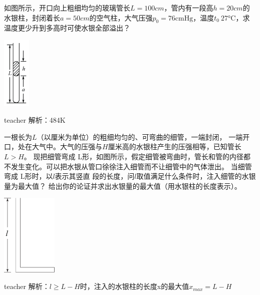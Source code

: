 \begin{example}
	如图所示，开口向上粗细均匀的玻璃管长$L = 100\si{cm}$，管内有一段高$h=20\si{cm}$的水银柱，封闭着长$a=50\si{cm}$的空气柱，大气压强$p_0 = 76\text{cmHg}$，温度$t_0 \ 27\si{\degreeCelsius}$，求温度更少升到多高时可使水银全部溢出？
		\begin{flushright}
			\includegraphics[width = 0.1\textwidth]{images/thermal-9.pdf} 
		\end{flushright}
	\begin{taggedblock}{teacher}
		\noindent
		解析：484K
	\end{taggedblock}
\end{example}

\begin{example}
	一根长为$ L（$以厘米为单位）的粗细均匀的、可弯曲的细管，一端封闭，
	一端开口，处在大气中。大气的压强与$H$厘米高的水银柱产生的压强相等，已知管长$ L>H$。 现把细管弯成 L形，如图所示，假定细管被弯曲时，管长和管的内径都不发生变化。可以把水银从管口徐徐注入细管而不让细管中的气体泄出。
	当细管弯成 L形时，以$ l $表示其竖直 段的长度，问$ l $取值满足什么条件时，注入细管的水银量为最大值？
	给出你的论证并求出水银量的最大值（用水银柱的长度表示）。
		\begin{flushright}
			\includegraphics[width = 0.2\textwidth]{images/thermal-5.pdf} 
		\end{flushright}
	\begin{taggedblock}{teacher}
		\noindent
		解析：$l≥L-H$时，注入的水银柱的长度x的最大值$x_{max}=L-H$
	\end{taggedblock}
\end{example}

